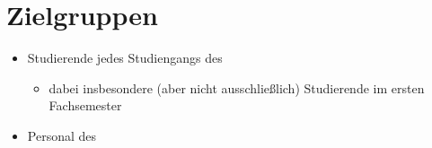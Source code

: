 \section{Zielgruppen}

\begin{itemize}
	\item Studierende jedes Studiengangs des %
	\begin{itemize}
		\item dabei insbesondere (aber nicht ausschließlich) Studierende im ersten Fachsemester
	\end{itemize}
	\item Personal des %
\end{itemize}